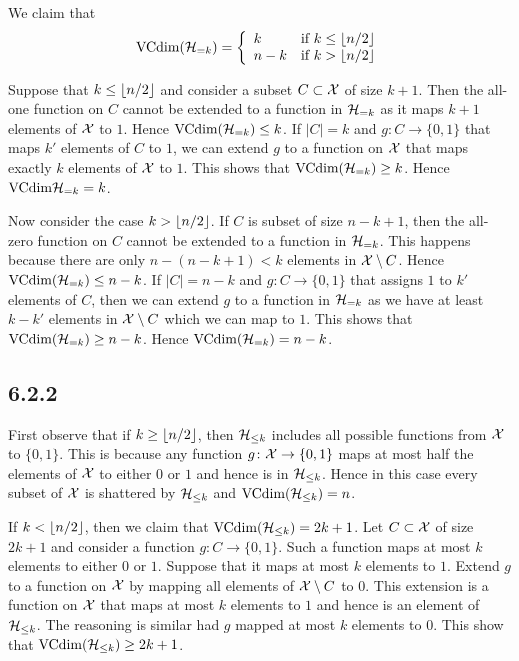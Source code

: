 We claim that
\[\text{VCdim}(\mathcal{H}_{= k})
= \left \{ \begin{array}{ll}
                k     & \text{if } k \leq \left \lfloor n / 2 \right \rfloor \\
                n - k & \text{if } k > \left \lfloor n / 2 \right \rfloor
           \end{array} \right .
\]

Suppose that $k \leq \left \lfloor n / 2 \right \rfloor$ and consider a subset $C \subset \mathcal{X}$
of size $k + 1$. Then the all-one function on $C$ cannot be
extended to a function in $\mathcal{H}_{= k}$ as it maps $k + 1$ elements
of $\mathcal{X}$ to $1$. Hence $\text{VCdim}(\mathcal{H}_{= k}) \leq k$. If $|C| = k$
and $g \colon C \rightarrow \{0, 1\}$ that maps $k'$ elements of $C$ to $1$,
we can extend $g$ to a function on $\mathcal{X}$ that maps exactly $k$ elements of
$\mathcal{X}$ to $1$.  This shows that $\text{VCdim}(\mathcal{H}_{= k}) \geq k$. Hence
$\text{VCdim}{\ensuremath{\mathcal{H}}_{= k}} = k$.

Now consider the case $k > \left \lfloor n / 2 \right \rfloor$. If $C$ is subset of size
$n - k + 1$, then the all-zero function on $C$ cannot be extended
to a function in $\mathcal{H}_{= k}$. This happens because there are only
$n - (n - k + 1) < k$ elements in $\mathcal{X} \setminus C$. Hence
$\text{VCdim}(\mathcal{H}_{= k}) \leq n - k$. If $|C| = n - k$ and
$g \colon C \rightarrow \{0, 1\}$ that assigns $1$ to $k'$
elements of $C$, then we can extend $g$ to a function in
$\mathcal{H}_{= k}$ as we have at least $k - k'$ elements in
$\mathcal{X} \setminus C$ which we can map to $1$. This shows that
$\text{VCdim}(\mathcal{H}_{= k}) \geq n - k$. Hence
$\text{VCdim}(\mathcal{H}_{= k}) = n - k$.

\subsection*{6.2.2}

First observe that if $k \geq \left \lfloor n / 2 \right \rfloor$, then $\mathcal{H}_{\leq k}$ includes
all possible functions from $\mathcal{X}$ to $\{0, 1\}$. This is because any function
$g \colon \mathcal{X} \rightarrow \{0, 1\}$ maps at most half the elements of
$\mathcal{X}$ to either $0$ or $1$ and hence is in $\mathcal{H}_{\leq k}$.
Hence in this case every subset of $\mathcal{X}$ is shattered by $\mathcal{H}_{\leq k}$
and $\text{VCdim} (\mathcal{H}_{\leq k}) = n$.

If $k < \left \lfloor n / 2 \right \rfloor$, then we claim that  $\text{VCdim} (\mathcal{H}_{\leq k}) = 2k + 1$.
Let $C \subset \mathcal{X}$ of size $2k + 1$ and consider a function
$g \colon C \rightarrow \{0, 1\}$. Such a function maps at most $k$ elements
to either $0$ or $1$. Suppose that it maps at most $k$ elements to $1$. Extend
$g$ to a function on $\mathcal{X}$ by mapping all elements of $\mathcal{X} \setminus C$ to $0$.
This extension is a function on $\mathcal{X}$ that maps at most $k$ elements to $1$
and hence is an element of $\mathcal{H}_{\leq k}$. The reasoning is similar had $g$
mapped at most $k$ elements to $0$. This show that
$\text{VCdim}(\mathcal{H}_{\leq k}) \geq 2k + 1$.

